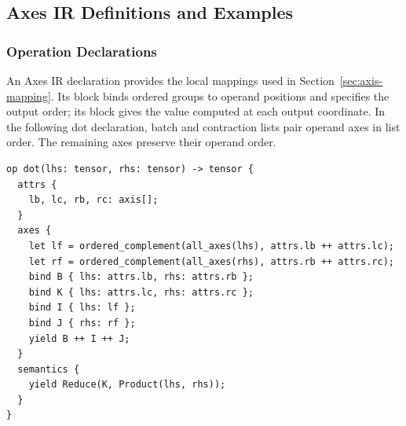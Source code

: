 \subsection{Axes IR Definitions and Examples}
\label{app:axes}

\subsubsection{Operation Declarations}
\label{sec:axes-ir}
An Axes IR declaration provides the local mappings used in
Section~\ref{sec:axis-mapping}. Its  block binds ordered groups
to operand positions and specifies the output order; its 
block gives the value computed at each output coordinate. In the following
dot declaration, batch and contraction lists pair operand axes in list
order. The remaining axes preserve their operand order.

\begin{lstlisting}[language=TEPL,
  caption={Axes IR representation of generalized dot, with explicit attributes, axis bindings, and value semantics.},
  label={lst:dot-declaration}]
op dot(lhs: tensor, rhs: tensor) -> tensor {
  attrs {
    lb, lc, rb, rc: axis[];
  }
  axes {
    let lf = ordered_complement(all_axes(lhs), attrs.lb ++ attrs.lc);
    let rf = ordered_complement(all_axes(rhs), attrs.rb ++ attrs.rc);
    bind B { lhs: attrs.lb, rhs: attrs.rb };
    bind K { lhs: attrs.lc, rhs: attrs.rc };
    bind I { lhs: lf };
    bind J { rhs: rf };
    yield B ++ I ++ J;
  }
  semantics {
    yield Reduce(K, Product(lhs, rhs));
  }
}
\end{lstlisting}


